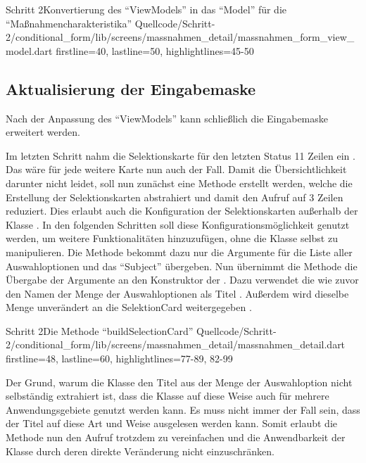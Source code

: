 \begin{alexlisting}{Schritt 2}{Konvertierung des \enquote{ViewModels} in das \enquote{Model} für die \enquote{Maßnahmencharakteristika}}
  {Quellcode/Schritt-2/conditional_form/lib/screens/massnahmen_detail/massnahmen_form_view_model.dart}
  {firstline=40, lastline=50, highlightlines={45-50}}
  \label{lst:Schritt2KonvertierungDesViewModelsInDasModel}
\end{alexlisting}

\subsection{Aktualisierung der Eingabemaske}

Nach der Anpassung des \enquote{ViewModels} kann schließlich die Eingabemaske erweitert werden.

Im letzten Schritt nahm die Selektionskarte für den letzten Status 11 Zeilen ein . 
Das wäre für jede weitere Karte nun auch der Fall.
Damit die Übersichtlichkeit darunter nicht leidet, soll nun zunächst eine Methode erstellt werden, welche die Erstellung der Selektionskarten abstrahiert und damit den Aufruf auf 3 Zeilen reduziert.
Dies erlaubt auch die Konfiguration der Selektionskarten außerhalb der Klasse .
In den folgenden Schritten soll diese Konfigurationsmöglichkeit genutzt werden, um weitere Funktionalitäten hinzuzufügen, ohne die Klasse selbst zu manipulieren.
Die Methode  bekommt dazu nur die Argumente für die Liste aller Auswahloptionen   und das \enquote{Subject}   übergeben.
Nun übernimmt die Methode die Übergabe der Argumente an den Konstruktor der .
Dazu verwendet die  wie zuvor den Namen der Menge der Auswahloptionen als Titel .
Außerdem wird dieselbe Menge unverändert an die SelektionCard weitergegeben .

\begin{alexlisting}{Schritt 2}{Die Methode \enquote{buildSelectionCard}}
  {Quellcode/Schritt-2/conditional_form/lib/screens/massnahmen_detail/massnahmen_detail.dart}
  {firstline=48, lastline=60, highlightlines={77-89, 82-99}}
  \label{lst:Schritt2MassnahmencharakteristikaSelektionskartenWerdenErgaenzt}
\end{alexlisting}

Der Grund, warum die Klasse  den Titel aus der Menge der Auswahloption nicht selbständig extrahiert ist, dass die Klasse auf diese Weise auch für mehrere Anwendungsgebiete genutzt werden kann.
Es muss nicht immer der Fall sein, dass der Titel auf diese Art und Weise ausgelesen werden kann.
Somit erlaubt die Methode  nun den Aufruf trotzdem zu vereinfachen und die Anwendbarkeit der Klasse  durch deren direkte Veränderung nicht einzuschränken.

